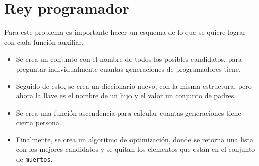 \section{Rey programador}

Para este problema es importante hacer un esquema de lo que se quiere lograr con cada función auxiliar. 
\begin{itemize}
    \item Se crea un conjunto con el nombre de todos los posibles candidatos, para preguntar individualmente cuantas generaciones de programadores tiene.
    \item Seguido de esto, se crea un diccionario nuevo, con la misma estructura, pero ahora la llave es el nombre de un hijo y el valor un conjunto de padres.
    \item Se crea una función ascendencia para calcular cuantas generaciones tiene cierta persona.
    \item Finalmente, se crea un algoritmo de optimización, donde se retorna una lista con los mejores candidatos y se quitan los elementos que están en el conjunto de \texttt{muertos}.
\end{itemize}


